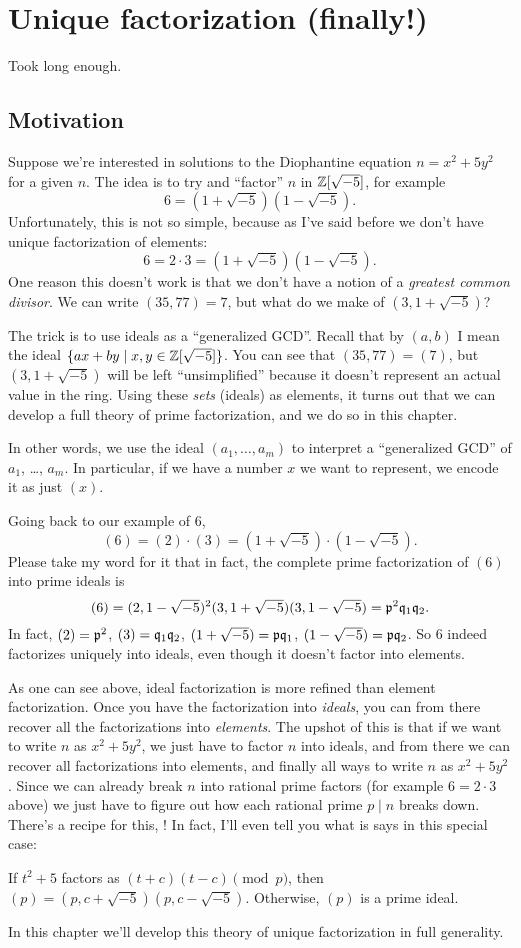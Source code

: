 \chapter{Unique factorization (finally!)}
Took long enough.

\section{Motivation}
Suppose we're interested in solutions to the
Diophantine equation $n = x^2 + 5y^2$ for a given $n$.
The idea is to try and ``factor'' $n$ in $\mathbb Z[\sqrt{-5}]$,
for example \[ 6 = (1+\sqrt{-5})(1-\sqrt{-5}). \]
Unfortunately, this is not so simple, because as I've said before
we don't have unique factorization of elements:
\[ 6 = 2 \cdot 3 = \left( 1+\sqrt{-5} \right)\left( 1-\sqrt{-5} \right). \]
One reason this doesn't work is that we don't have a notion of a
\emph{greatest common divisor}.
We can write $(35, 77) = 7$, but what do we make of $(3, 1+\sqrt{-5})$?

The trick is to use ideals as a ``generalized GCD''.
Recall that by $(a,b)$ I mean the ideal $\{ax + by \mid x,y \in \mathbb Z[\sqrt{-5}] \}$.
You can see that $(35, 77) = (7)$,
but $(3, 1+\sqrt{-5})$ will be left ``unsimplified'' because it doesn't
represent an actual value in the ring.
Using these \emph{sets} (ideals) as elements,
it turns out that we can develop a full theory
of prime factorization, and we do so in this chapter.

In other words, we use the ideal $(a_1, \dots, a_m)$
to interpret a ``generalized GCD'' of $a_1$, \dots, $a_m$.
In particular, if we have a number $x$ we want to represent,
we encode it as just $(x)$.

Going back to our example of $6$,
\[ (6) = (2) \cdot (3)
	= \left( 1+\sqrt{-5} \right) \cdot \left( 1-\sqrt{-5} \right). \]
Please take my word for it that in fact,
the complete prime factorization of $(6)$ into prime ideals is
\[
	(6)
	= (2,1-\sqrt{-5})^2 (3,1+\sqrt{-5})(3,1-\sqrt{-5})
	= \mathfrak p^2 \mathfrak q_1 \mathfrak q_2. \]
In fact, $(2) = \mathfrak p^2$, $(3) = \mathfrak q_1 \mathfrak q_2$,
$(1+\sqrt{-5}) = \mathfrak p \mathfrak q_1$, $(1-\sqrt{-5}) = \mathfrak p \mathfrak q_2$.
So $6$ indeed factorizes uniquely into ideals,
even though it doesn't factor into elements.

As one can see above,
ideal factorization is more refined than element factorization.
Once you have the factorization into \emph{ideals},
you can from there recover all the factorizations into \emph{elements}.
The upshot of this is that if we want to write $n$ as $x^2+5y^2$,
we just have to factor $n$ into ideals,
and from there we can recover all factorizations into elements,
and finally all ways to write $n$ as $x^2+5y^2$.
Since we can already break $n$ into rational prime factors
(for example $6 = 2 \cdot 3$ above)
we just have to figure out how each rational prime $p \mid n$ breaks down.
There's a recipe for this, !
In fact, I'll even tell you what is says in this special case:
\begin{itemize}
	\ii If $t^2+5$ factors as $(t+c)(t-c) \pmod p$,
	then $(p) = (p, c+\sqrt{-5})(p, c-\sqrt{-5})$.
	\ii Otherwise, $(p)$ is a prime ideal.
\end{itemize}
In this chapter we'll develop this theory of unique factorization in full generality.

